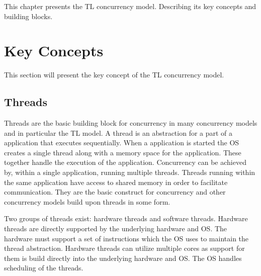 \makeatletter {}\makeatother
{}
This chapter presents the \ac{TL} concurrency model. Describing its key concepts and building blocks.
\label{chap:threads_locks}
\section{Key Concepts}
This section will present the key concept of the \ac{TL} concurrency model. 
\subsection{Threads}\label{subsec:threads}
Threads are the basic building block for concurrency in many concurrency models and in particular the \ac{TL} model. A thread is an abstraction for a part of a application that executes sequentially. When a application is started the \ac{OS} creates a single thread along with a memory space for the application. These together handle the execution of the application. Concurrency can be achieved by, within a single application, running multiple threads. Threads running within the same application have access to shared memory in order to facilitate communication. They are the basic construct for concurrency and other concurrency models build upon threads in some form.

Two groups of threads exist: hardware threads and software threads. Hardware threads are directly supported by the underlying hardware and \ac{OS}. The hardware must support a set of instructions which the \ac{OS} uses to maintain the thread abstraction. Hardware threads can utilize multiple cores as support for them is build directly into the underlying hardware and \ac{OS}. The \ac{OS} handles scheduling of the threads.

